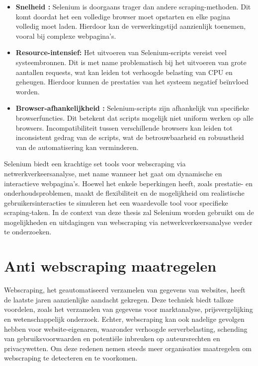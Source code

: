 \begin{itemize}
    \item \textbf{Snelheid :} Selenium is doorgaans trager dan andere scraping-methoden. Dit komt doordat het een volledige browser moet opstarten en elke pagina volledig moet laden. Hierdoor kan de verwerkingstijd aanzienlijk toenemen, vooral bij complexe webpagina's.

    \item \textbf{Resource-intensief:} Het uitvoeren van Selenium-scripts vereist veel systeembronnen. Dit is met name problematisch bij het uitvoeren van grote aantallen requests, wat kan leiden tot verhoogde belasting van CPU en geheugen. Hierdoor kunnen de prestaties van het systeem negatief beïnvloed worden.

    \item \textbf{Browser-afhankelijkheid :} Selenium-scripts zijn afhankelijk van specifieke browserfuncties. Dit betekent dat scripts mogelijk niet uniform werken op alle browsers. Incompatibiliteit tussen verschillende browsers kan leiden tot inconsistent gedrag van de scripts, wat de betrouwbaarheid en robuustheid van de automatisering kan verminderen.
\end{itemize}

Selenium biedt een krachtige set tools voor webscraping via netwerkverkeersanalyse, met name wanneer het gaat om dynamische en interactieve webpagina's. Hoewel het enkele beperkingen heeft, zoals prestatie- en onderhoudsproblemen, maakt de flexibiliteit en de mogelijkheid om realistische gebruikersinteracties te simuleren het een waardevolle tool voor specifieke scraping-taken. In de context van deze thesis zal Selenium worden gebruikt om de mogelijkheden en uitdagingen van webscraping via netwerkverkeersanalyse verder te onderzoeken.

\section{Anti webscraping maatregelen}
Webscraping, het geautomatiseerd verzamelen van gegevens van websites, heeft de laatste jaren aanzienlijke aandacht gekregen. Deze techniek biedt talloze voordelen, zoals het verzamelen van gegevens voor marktanalyse, prijsvergelijking en wetenschappelijk onderzoek. Echter, webscraping kan ook nadelige gevolgen hebben voor website-eigenaren, waaronder verhoogde serverbelasting, schending van gebruiksvoorwaarden en potentiële inbreuken op auteursrechten en privacywetten. Om deze redenen nemen steeds meer organisaties maatregelen om webscraping te detecteren en te voorkomen.

